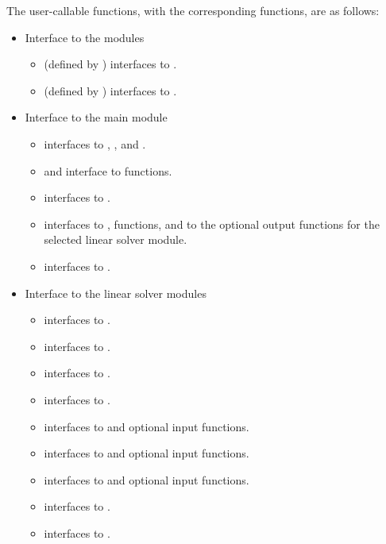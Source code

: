 The user-callable functions, with the corresponding {\kinsol} functions,
are as follows:
\begin{itemize}
\item
  Interface to the {\nvector} modules
  \begin{itemize}
  \item {} (defined by {\nvecs}) 
    interfaces to .
  \item {} (defined by {\nvecp}) 
    interfaces to .
  \end{itemize}
\item Interface to the main {\kinsol} module
  \begin{itemize}
  \item {}
    interfaces to , , and .
  \item {} and 
    interface to  functions.
  \item {}
    interfaces to .
  \item {}
    interfaces to ,  functions, and to the optional
    output functions for the selected linear solver module.
  \item {}    
    interfaces to .
  \end{itemize}  
\item Interface to the linear solver modules
  \begin{itemize}
  \item {}
    interfaces to .
  \item {}
    interfaces to .
  \item {}
    interfaces to .
  \item {}
    interfaces to .
  \item {}
    interfaces to  and {\spgmr} optional input functions.
  \item {}
    interfaces to  and {\spbcg} optional input functions.
  \item {}
    interfaces to  and {\sptfqmr} optional input functions.
  \item {}
    interfaces to .
  \item {}
    interfaces to .
 \end{itemize}

\end{itemize}

